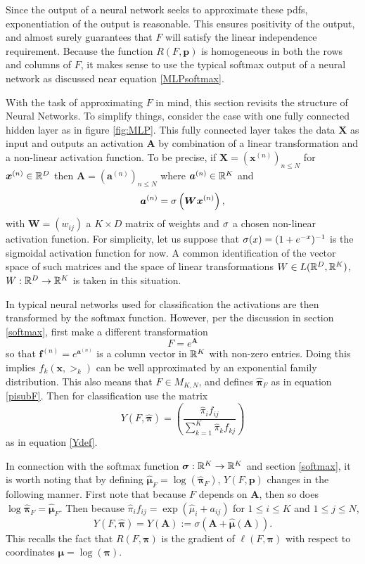 Since the output of a neural network seeks to approximate these pdfs, exponentiation of the output is reasonable.  This ensures positivity of the output, and almost surely guarantees that \( F  \) will satisfy the linear independence requirement.  Because the function \( R(F,\bm p) \) is homogeneous in both the rows and columns of \( F \), it makes sense to use the typical softmax output of a neural network as discussed near equation \ref{MLPsoftmax}.

With the task of approximating \( F \) in mind, this section revisits the structure of Neural Networks.  To simplify things, consider the case with one fully connected hidden layer as in figure \ref{fig:MLP}.  This fully connected layer takes the data $\bm X$ as input and outputs an activation $\bm A$ by combination of a linear transformation and a non-linear activation function.  To be precise, if $\bm X=(\bm x^{(n)})_{n\leq N}$ for $\bm x^{(n)}\in \mathbb R^{D}$ then $\bm A=(\bm a^{(n)})_{n\leq N}$ where $\bm a^{(n)}\in \mathbb R^{K}$ and
\[\bm a^{(n)}=\sigma\left(\bm W\bm x^{(n)}\right),\]
with $\bm W=(w_{ij})$ a $K\times D$ matrix of weights and \( \sigma \) a chosen non-linear activation function. For simplicity, let us suppose that \( \sigma(x) = (1+e^{-x})^{-1} \) is the sigmoidal activation function for now. A common identification of the vector space of such matrices and the space of linear transformations $W\in L(\mathbb R^D,\mathbb R^K)$, $W:\mathbb R^D\rightarrow \mathbb R^K$ is taken in this situation.

In typical neural networks used for classification the activations are then transformed by the softmax function.  However, per the discussion in section \ref{softmax},
first make a different transformation
\[F=e^{\bm A}\]
so that $\bm f^{(n)}=e^{\bm a^{(n)}}$ is a column vector in $\mathbb R^K$ with non-zero entries. Doing this implies \( f_k(\bm x,\bm\gt_k) \) can be well approximated by an exponential family distribution. This also means that $F\in M_{K,N}$, and defines $\hat{\bm\pi}_F$ as in equation \ref{pisubF}. Then for classification use the matrix
\[Y(F,\hat{\bm\pi})=\left(\frac{\hat{\pi}_if_{ij}}{\sum_{k=1}^{K}\hat{\pi}_kf_{kj}}\right)\]
as in equation \ref{Ydef}.  

In connection with the softmax function $\bm\sigma:\mathbb R^K\rightarrow\mathbb R^K$ and section \ref{softmax}, it is worth noting that by defining $\hat{\bm\mu}_F=\log(\hat{\bm\pi}_F)$, $Y(F,\bm p)$ changes in the following manner.  First note that because $F$ depends on $\bm A$, then so does $\log\hat{\bm\pi}_F=\hat{\bm\mu}_F$.  Then because $\hat{\pi}_if_{ij}=\exp(\hat{\mu}_i+a_{ij})$ for $1\leq i\leq K$ and $1\leq j\leq N$, 
\begin{equation}\label{eqn:YdefLogcoords}
Y(F,\hat{\bm\pi})=Y(\bm A):=\sigma(\bm A+\hat{\bm\mu}(\bm A)).
\end{equation}
This recalls the fact that \( R(F,\bm\pi) \) is the gradient of \( \ell(F,\bm\pi) \) with respect to coordinates \( \bm\mu = \log(\bm\pi)  \).
